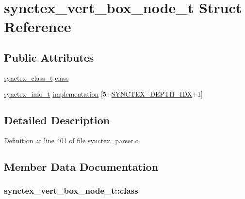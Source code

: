 \hypertarget{structsynctex__vert__box__node__t}{\section{synctex\+\_\+vert\+\_\+box\+\_\+node\+\_\+t Struct Reference}
\label{structsynctex__vert__box__node__t}
}
\subsection*{Public Attributes}
\begin{DoxyCompactItemize}
\item 
\hyperlink{synctex__parser_8c_a68d11a2cb22716e7abd35cffed7d54c5}{synctex\+\_\+class\+\_\+t} \hyperlink{structsynctex__vert__box__node__t_aab4681e4d787feaab745b7a93eb6e6c6}{class}
\item 
\hyperlink{synctex__parser_8c_a864f981cdab43a24765efb685074cf70}{synctex\+\_\+info\+\_\+t} \hyperlink{structsynctex__vert__box__node__t_a35dfef7dc54c9ce718e2c97dce5b673b}{implementation} \mbox{[}5+\hyperlink{synctex__parser_8c_a0e26cbae47f43d1a9bfe1de9f67b9c05}{S\+Y\+N\+C\+T\+E\+X\+\_\+\+D\+E\+P\+T\+H\+\_\+\+I\+D\+X}+1\mbox{]}
\end{DoxyCompactItemize}


\subsection{Detailed Description}


Definition at line 401 of file synctex\+\_\+parser.\+c.



\subsection{Member Data Documentation}
\hypertarget{structsynctex__vert__box__node__t_aab4681e4d787feaab745b7a93eb6e6c6}{
\subsubsection[{class}]{ synctex\+\_\+vert\+\_\+box\+\_\+node\+\_\+t\+::class}}\label{structsynctex__vert__box__node__t_aab4681e4d787feaab745b7a93eb6e6c6}


